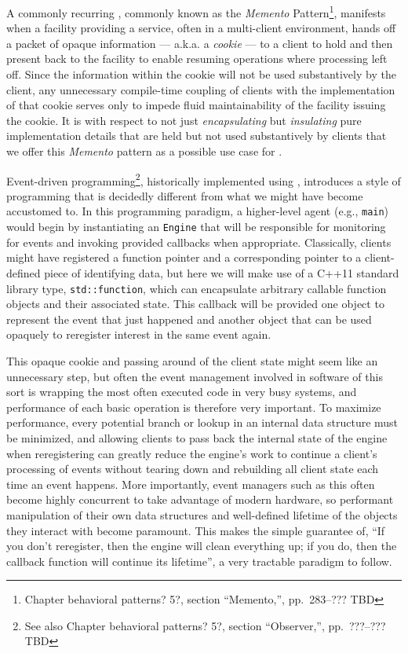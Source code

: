 A commonly recurring , commonly known as the
\emph{Memento} Pattern\footnote{\cite{gamma95} Chapter
behavioral patterns? 5?, section ``Memento,'', pp.~283--???
TBD}, manifests when a facility providing a service, often in a
multi-client environment, hands off a packet of opaque information ---
a.k.a. a \emph{cookie} --- to a client to hold and then present back to
the facility to enable resuming operations where processing left off.
Since the information within the cookie will not be used substantively
by the client, any unnecessary compile-time coupling of clients with the
implementation of that cookie serves only to impede fluid
maintainability of the facility issuing the cookie. It is with respect
to not just \emph{encapsulating} but \emph{insulating} pure
implementation details that are held but not used substantively by
clients that we offer this \emph{Memento} pattern as a possible use case
for .

Event-driven programming\footnote{See also \cite{gamma95}
Chapter behavioral patterns? 5?, section ``Observer,'',
pp.~???--??? TBD}, historically implemented using , introduces a style of programming that is decidedly
different from what we might have become accustomed to. In this
programming paradigm, a higher-level agent (e.g., \lstinline!main!) would
begin by instantiating an \lstinline!Engine! that will be responsible for
monitoring for events and invoking provided callbacks when appropriate.
Classically, clients might have registered a function pointer and a
corresponding pointer to a client-defined piece of identifying data, but
here we will make use of a C++11 standard library type,
\lstinline!std::function!, which can encapsulate arbitrary callable
function objects and their associated state. This callback will be
provided one object to represent the event that just happened and
another object that can be used opaquely to reregister interest in the
same event again.

This opaque cookie and passing around of the client state might seem
like an unnecessary step, but often the event management involved in
software of this sort is wrapping the most often executed code in very
busy systems, and performance of each basic operation is therefore very
important. To maximize performance, every potential branch or lookup in
an internal data structure must be minimized, and allowing clients to
pass back the internal state of the engine when reregistering can
greatly reduce the engine's work to continue a client's processing of
events without tearing down and rebuilding all client state each time an
event happens. More importantly, event managers such as this often
become highly concurrent to take advantage of modern hardware, so
performant manipulation of their own data structures and well-defined
lifetime of the objects they interact with become paramount. This makes
the simple guarantee of, ``If you don't reregister, then the engine will
clean everything up; if you do, then the callback function will continue
its lifetime'', a very tractable paradigm to follow.

